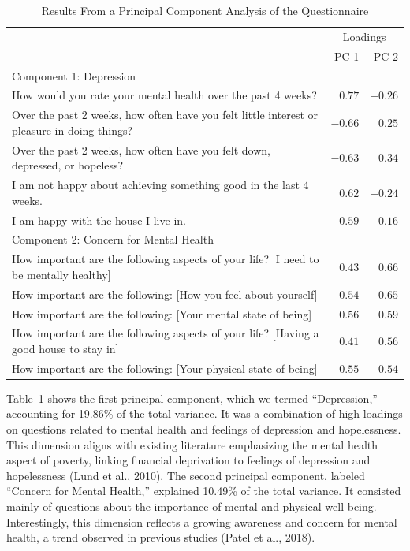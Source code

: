 \documentclass[
]{article}
\begin{document}
\hypertarget{tbl-pilot-pca}{}
\begin{longtable}{lrr}
\caption{\label{tbl-pilot-pca}Results From a Principal Component Analysis of the Questionnaire }\tabularnewline

\toprule
 & \multicolumn{2}{c}{Loadings} \\ 
\cmidrule(lr){2-3}
 & PC 1 & PC 2 \\ 
\midrule
\multicolumn{3}{l}{Component 1: Depression} \\ 
\midrule
How would you rate your mental health over the past 4 weeks? & $0.77$ & $-0.26$ \\ 
Over the past 2 weeks, how often have you felt little interest or pleasure in doing things? & $-0.66$ & $0.25$ \\ 
Over the past 2 weeks, how often have you felt down, depressed, or hopeless? & $-0.63$ & $0.34$ \\ 
I am not happy about achieving something good in the last 4 weeks. & $0.62$ & $-0.24$ \\ 
I am happy with the house I live in. & $-0.59$ & $0.16$ \\ 
\midrule
\multicolumn{3}{l}{Component 2: Concern for Mental Health} \\ 
\midrule
How important are the following aspects of your life? [I need to be mentally healthy] & $0.43$ & $0.66$ \\ 
How important are the following: [How you feel about yourself] & $0.54$ & $0.65$ \\ 
How important are the following: [Your mental state of being] & $0.56$ & $0.59$ \\ 
How important are the following aspects of your life? [Having a good house to stay in] & $0.41$ & $0.56$ \\ 
How important are the following: [Your physical state of being] & $0.55$ & $0.54$ \\ 
\bottomrule
\end{longtable}

Table~\ref{tbl-pilot-pca} shows the first principal component, which we
termed ``Depression,'' accounting for 19.86\% of the total variance. It
was a combination of high loadings on questions related to mental health
and feelings of depression and hopelessness. This dimension aligns with
existing literature emphasizing the mental health aspect of poverty,
linking financial deprivation to feelings of depression and hopelessness
(Lund et al., 2010). The second principal component, labeled ``Concern
for Mental Health,'' explained 10.49\% of the total variance. It
consisted mainly of questions about the importance of mental and
physical well-being. Interestingly, this dimension reflects a growing
awareness and concern for mental health, a trend observed in previous
studies (Patel et al., 2018).
\end{document}
